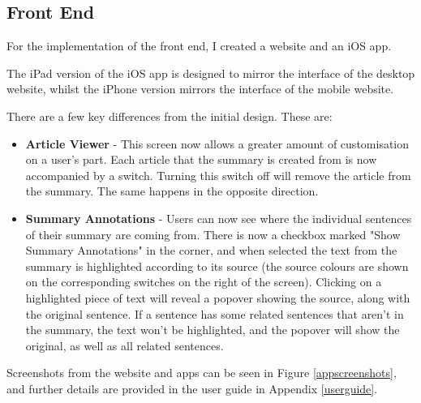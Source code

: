 \documentclass[12pt]{article}
\begin{document}
\subsection{Front End}

\label{frontendimplementation}

For the implementation of the front end, I created a website and an iOS app.

The iPad version of the iOS app is designed to mirror the interface of the desktop website, whilst the iPhone version mirrors the interface of the mobile website. 

There are a few key differences from the initial design. These are:

\begin{itemize}
	\item \textbf{Article Viewer} - This screen now allows a greater amount of customisation on a user's part. Each article that the summary is created from is now accompanied by a switch. Turning this switch off will remove the article from the summary. The same happens in the opposite direction.
	\item \textbf{Summary Annotations} - Users can now see where the individual sentences of their summary are coming from. There is now a checkbox marked "Show Summary Annotations" in the corner, and when selected the text from the summary is highlighted according to its source (the source colours are shown on the corresponding switches on the right of the screen). Clicking on a highlighted piece of text will reveal a popover showing the source, along with the original sentence. If a sentence has some related sentences that aren't in the summary, the text won't be highlighted, and the popover will show the original, as well as all related sentences. \\
\end{itemize}

Screenshots from the website and apps can be seen in Figure \ref{appscreenshots}, and further details are provided in the user guide in Appendix \ref{userguide}.
\end{document}
